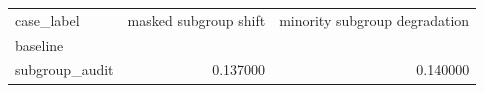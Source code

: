 \begin{tabular}{lrr}
\toprule
case_label & masked subgroup shift & minority subgroup degradation \\
baseline &  &  \\
\midrule
subgroup_audit & 0.137000 & 0.140000 \\
\bottomrule
\end{tabular}
